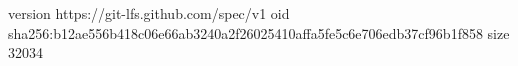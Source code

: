version https://git-lfs.github.com/spec/v1
oid sha256:b12ae556b418c06e66ab3240a2f26025410affa5fe5c6e706edb37cf96b1f858
size 32034

